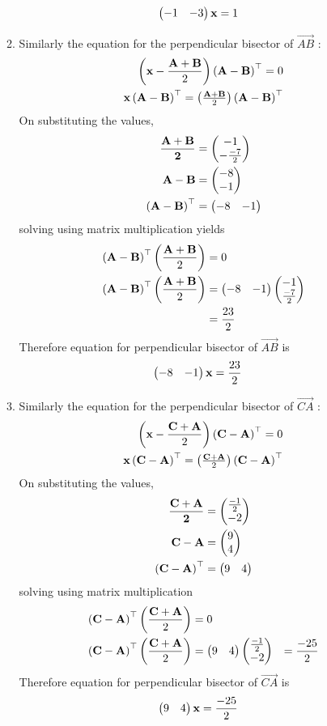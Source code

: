 \documentclass[10pt]{book}
\begin{document}
\begin{enumerate}[label=\thesection.\arabic*.,ref=\thesection.\theenumi]
\begin{enumerate}
\begin{align}
    \begin{pmatrix}-1 & -3\end{pmatrix}\mathbf{x}&= 1
\end{align}
\item Similarly the equation for the perpendicular bisector of $\vec{AB}$ :
\begin{align}
    \left(\mathbf{x}-\frac{\mathbf{A}+\mathbf{B}}{2}\right)\left(\mathbf{A}-\mathbf{B}\right)^{\top} = 0 \\
    \mathbf{x}\left(\mathbf{A} - \mathbf{B}\right)^{\top}= \begin{pmatrix}\frac{\mathbf{A}+\mathbf{B}}{2}\end{pmatrix}\left(\mathbf{A}-\mathbf{B}\right)^{\top}
\end{align}
On substituting the values,
\begin{align}
\mathbf{\frac{\mathbf{A}+\mathbf{B}}{2}} &= \begin{pmatrix}-1 \\ -\frac{-7}{2}\end{pmatrix} \\
\mathbf{A}-\mathbf{B} &= \begin{pmatrix}-8 \\ -1\end{pmatrix} \\
\left(\mathbf{A}-\mathbf{B}\right)^{\top} &= \begin{pmatrix}-8 & -1\end{pmatrix}
\end{align}
solving using matrix multiplication yields
\begin{align}
\left(\mathbf{A}-\mathbf{B}\right)^{\top}\left(\frac{\mathbf{A}+\mathbf{B}}{2}\right)&=0 \\
\left(\mathbf{A}-\mathbf{B}\right)^{\top}\left(\frac{\mathbf{A}+\mathbf{B}}{2}\right)&=\begin{pmatrix}-8 & -1\end{pmatrix}\begin{pmatrix}-1 \\ \frac{-7}{2}\end{pmatrix}\\
&= \frac{23}{2}
\end{align}
Therefore equation for perpendicular bisector of $\vec{AB}$ is
\begin{align}
    \begin{pmatrix}-8 & -1\end{pmatrix}\mathbf{x}&= \frac{23}{2}
\end{align}
  \item Similarly the equation for the perpendicular bisector of $\vec{CA}$ :
\begin{align}
    \left(\mathbf{x}-\frac{\mathbf{C}+\mathbf{A}}{2}\right)\left(\mathbf{C}-\mathbf{A}\right)^{\top} = 0 \\
    \mathbf{x}\left(\mathbf{C} - \mathbf{A}\right)^{\top}= \begin{pmatrix}\frac{\mathbf{C}+\mathbf{A}}{2}\end{pmatrix}\left(\mathbf{C}-\mathbf{A}\right)^{\top}
\end{align}
On substituting the values,
\begin{align}
\mathbf{\frac{\mathbf{C}+\mathbf{A}}{2}} &= \begin{pmatrix}\frac{-1}{2} \\ -2\end{pmatrix} \\
\mathbf{C}-\mathbf{A} &= \begin{pmatrix}9 \\ 4\end{pmatrix} \\
\left(\mathbf{C}-\mathbf{A}\right)^{\top} &= \begin{pmatrix}9 & 4\end{pmatrix}
\end{align}
solving using matrix multiplication
\begin{align}
\left(\mathbf{C}-\mathbf{A}\right)^{\top}\left(\frac{\mathbf{C}+\mathbf{A}}{2}\right)&=0 \\
\left(\mathbf{C}-\mathbf{A}\right)^{\top}\left(\frac{\mathbf{C}+\mathbf{A}}{2}\right)&=\begin{pmatrix}9 & 4\end{pmatrix}\begin{pmatrix}\frac{-1}{2} \\ -2\end{pmatrix}
&= \frac{-25}{2}
\end{align}
Therefore equation for perpendicular bisector of $\vec{CA}$ is
\begin{align}
    \begin{pmatrix}9 & 4\end{pmatrix}\mathbf{x}&= \frac{-25}{2}
\end{align}
\end{enumerate}


\end{enumerate}
\end{document}
